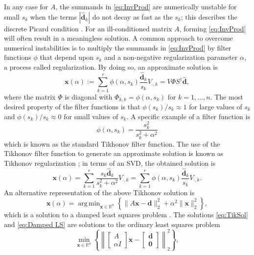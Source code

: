 \documentclass[12pt]{article}
\newcommand{\dVec}{\mathbf{d}}	%
\newcommand{\xVec}{\mathbf{x}}	%
\newcommand{\regparam}{\alpha}
\DeclareMathOperator*{\argmin}{arg\,min}
\newcommand{\filt}{\phi}
\newcommand{\zeroVec}{\bm{0}}	%
\newcommand{\singular}{s}	%
\newcommand{\svd}[1]{\widehat{#1}}	%
\begin{document}
In any case for $A$, the summands in \eqref{eq:InvProd} are numerically unstable for small $\singular_k$ when the terms $|\svd{\dVec}_k|$ do not decay as fast as the $s_k$; this describes the discrete Picard condition \cite{Hansen:98}. For an ill-conditioned matrix $A$, forming \eqref{eq:InvProd} will often result in a meaningless solution. A common approach to overcome numerical instabilities is to multiply the summands in \eqref{eq:InvProd} by filter functions $\filt$ that depend upon $\singular_k$ and a non-negative regularization parameter $\regparam$, a process called regularization. By doing so, an approximate solution is
\begin{equation}
\label{eq:ApproxSol}
\xVec(\regparam) := \sum_{k=1}^{r} \filt(\regparam,\singular_k) \frac{\svd{\dVec}_k}{\singular_k}V_{\cdot,k}  = V\Phi{S}^\dagger\svd{\dVec},
\end{equation}
where the matrix $\Phi$ is diagonal with $\Phi_{k,k} = \filt(\regparam,\singular_k)$ for $k = 1,\ldots,{n}$. The most desired property of the filter functions is that $\filt(\singular_k)/\singular_k \approx 1$  for large values of $\singular_k$ and $\filt(\singular_k)/\singular_k \approx 0$ for small values of $\singular_k$. A specific example of a filter function is
\begin{equation}
\label{eq:TikFilt}
\filt(\regparam,\singular_k)  = \frac{\singular_k^2}{\singular_k^2 + \regparam^2}
\end{equation}
which is known as the standard Tikhonov filter function. The use of the Tikhonov filter function to generate an approximate solution is known as Tikhonov regularization \cite{Tikh1963}; in terms of an SVD, the obtained solution is
\begin{equation}
\label{eq:TikSol}
\xVec(\regparam) = \sum_{k = 1}^{r} \frac{\singular_k \svd{\dVec}_k}{\singular_k^2 + \regparam^2}V_{\cdot,k} = \sum_{k = 1}^{r} \filt(\regparam,\singular_k)\frac{\svd{\dVec}_k}{\singular_k}V_{\cdot,k}.
\end{equation}
An alternative representation of the above Tikhonov solution is
\begin{equation}
\label{eq:Damped LS}
\xVec(\regparam) = \argmin_{\xVec \in \mathbb{R}^n} \left\{\|A\xVec - \dVec\|_2^2 + \regparam^2\|\xVec\|_2^2\right\},
\end{equation}
which is a solution to a damped least squares problem \cite{ABT}. The solutions \eqref{eq:TikSol} and \eqref{eq:Damped LS} are solutions to the ordinary least squares problem
\begin{equation}
\label{eq:Ordinary LS}
\min_{\xVec \in \mathbb{R}^n} \left\{\left\|
\begin{bmatrix}
A \\
\regparam I
\end{bmatrix}\xVec - 
\begin{bmatrix}
\dVec \\
\zeroVec
\end{bmatrix}
\right\|_2^2\right\},
\end{equation}
\end{document}

